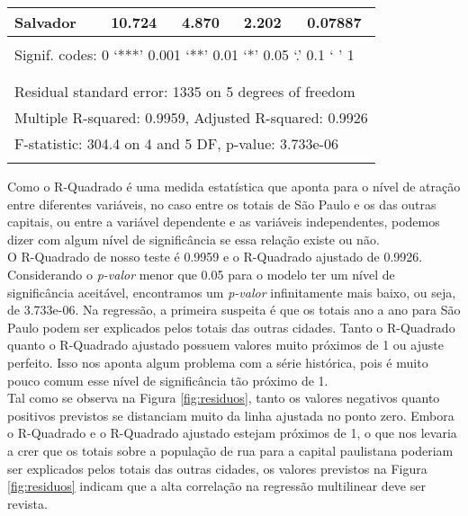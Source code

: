 \documentclass[14pt]{extarticle}
\begin{document}
\begin{landscape}
\begin{table}[htbp]
\begin{adjustbox}{max width=\linewidth}
\begin{tabular}{lllllllllll}
    Salvador & \multicolumn{2}{c}{10.724} & \multicolumn{2}{c}{4.870} & \multicolumn{2}{c}{2.202} & \multicolumn{4}{c}{0.07887} \\
    \midrule
    \multicolumn{11}{c}{} \\
    \midrule
    \multicolumn{11}{l}{Signif. codes:  0 ‘***’ 0.001 ‘**’ 0.01 ‘*’ 0.05 ‘.’ 0.1 ‘ ’ 1} \\
    \midrule
    \multicolumn{11}{c}{} \\
    \midrule
    \multicolumn{11}{c}{} \\
    \multicolumn{11}{l}{Residual standard error: 1335 on 5 degrees of freedom} \\
    \multicolumn{11}{l}{Multiple R-squared: 0.9959, Adjusted R-squared: 0.9926} \\
    \multicolumn{11}{l}{F-statistic: 304.4 on 4 and 5 DF,  p-value: 3.733e-06} \\
    \multicolumn{11}{l}{} \\
    \bottomrule
    \end{tabular}%
    \end{adjustbox}
  \label{tab:regressao_multilinear_tabela}%
\end{table}%

\end{landscape}

Como o R-Quadrado é uma medida estatística que aponta para o nível de atração entre diferentes variáveis, no caso entre os totais de São Paulo e os das outras capitais, ou entre a variável dependente e as variáveis independentes, podemos dizer com algum nível de significância se essa relação existe ou não.\\

O R-Quadrado de nosso teste é 0.9959 e o R-Quadrado ajustado de 0.9926. Considerando o \emph{p-valor} menor que 0.05 para o modelo ter um nível de significância aceitável, encontramos um \emph{p-valor} infinitamente mais baixo, ou seja, de 3.733e-06. Na regressão, a primeira suspeita é que os totais ano a ano para São Paulo podem ser explicados pelos totais das outras cidades. Tanto o R-Quadrado quanto o R-Quadrado ajustado possuem valores muito próximos de 1 ou ajuste perfeito. Isso nos aponta algum problema com a série histórica, pois é muito pouco comum esse nível de significância tão próximo de 1.\\

Tal como se observa na Figura \ref{fig:residuos}, tanto os valores negativos quanto positivos previstos se distanciam muito da linha ajustada no ponto zero. Embora o R-Quadrado e o R-Quadrado ajustado estejam próximos de 1, o que nos levaria a crer que os totais sobre a população de rua para a capital paulistana poderiam ser explicados pelos totais das outras cidades, os valores previstos na Figura \ref{fig:residuos} indicam que a alta correlação na regressão multilinear deve ser revista.\\
\end{document}
